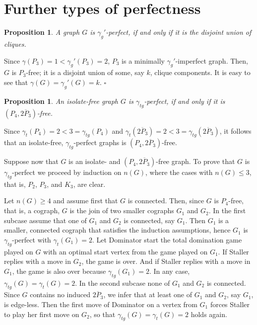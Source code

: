 \documentclass[12pt]{article}
\newtheorem{proposition}[theorem]{Proposition}
\newcommand{\proof}{\noindent{\bf Proof.\ }}
\newcommand{\qed}{\hfill $\square$ \bigskip}
\begin{document}
\section{Further types of perfectness}
\label{sec:further}

\begin{proposition}
	A graph $G$ is $\gamma_g'$-perfect, if and only if it is the disjoint union of cliques.
\end{proposition}
\proof Since $\gamma(P_3)=1 <\gamma_g'(P_3)=2$, $P_3$ is a minimally $\gamma_g'$-imperfect graph. Then, $G$ is $P_3$-free; it is a disjoint union of some, say $k$, clique components. It is easy to see that $\gamma(G)=\gamma_g'(G)=k$. \qed

\begin{proposition}
\label{prp:gamma-tg-perfect}
	An isolate-free graph $G$ is $\gamma_{tg}$-perfect, if and only if it is $(P_4, \overline{2P_3})$-free.
\end{proposition}

\proof 
Since $\gamma_t(P_4) = 2 < 3 = \gamma_{tg}(P_4)$ and $\gamma_t(\overline{2P_3}) = 2 < 3 = \gamma_{tg}(\overline{2P_3})$, it follows that an isolate-free, $\gamma_{tg}$-perfect graphs is $(P_4, \overline{2P_3})$-free.

Suppose now that $G$ is an isolate- and $(P_4, \overline{2P_3})$-free graph. To prove that $G$ is $\gamma_{tg}$-perfect we proceed by induction on $n(G)$, where the cases with $n(G)\le 3$, that is, $P_2$, $P_3$, and $K_3$, are clear. 

Let $n(G)\ge 4$ and assume first that $G$ is connected. Then, since $G$ is $P_4$-free, that is, a cograph, $G$ is the join of two smaller cographs $G_1$ and $G_2$. In the first subcase assume that one of $G_1$ and $G_2$ is connected, say $G_1$. Then $G_1$ is a smaller, connected cograph that satisfies the induction assumptions, hence $G_1$ is $\gamma_{tg}$-perfect with $\gamma_t(G_1) = 2$. Let Dominator start the total domination game played on $G$ with an optimal start vertex from the game played on $G_1$. If Staller replies with a move in $G_2$, the game is over. And if Staller replies with a move in $G_1$, the game is also over because $\gamma_{tg}(G_1) = 2$. In any case, $\gamma_{tg}(G) = \gamma_t(G) = 2$. In the second subcase none of $G_1$ and $G_2$ is connected. Since $G$ contains no induced $\overline{2P_3}$, we infer that at least one of $G_1$ and $G_2$, say $G_1$, is edge-less. Then the first move of Dominator on a vertex from $G_1$ forces Staller to play her first move on $G_2$, so that $\gamma_{tg}(G) = \gamma_t(G) = 2$ holds again.
\end{document}
